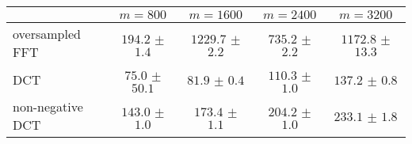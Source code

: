 \centering
\renewcommand{\arraystretch}{1.2}
\begin{tabular}{@{}lcccc@{}}
\toprule
 & $m=800$ & $m=1600$ & $m=2400$ & $m=3200$\\
\midrule
oversampled FFT & $194.2$ $\pm$ $1.4$ & $1229.7$ $\pm$ $2.2$ & $735.2$ $\pm$ $2.2$ & $1172.8$ $\pm$ $13.3$ \\
DCT & $75.0$ $\pm$ $50.1$ & $81.9$ $\pm$ $0.4$ & $110.3$ $\pm$ $1.0$ & $137.2$ $\pm$ $0.8$ \\
non-negative DCT & $143.0$ $\pm$ $1.0$ & $173.4$ $\pm$ $1.1$ & $204.2$ $\pm$ $1.0$ & $233.1$ $\pm$ $1.8$ \\
\bottomrule
\end{tabular}
